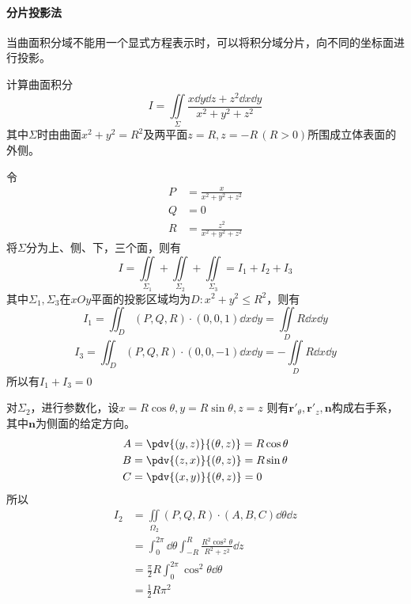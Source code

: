 \paragraph{分片投影法}
当曲面积分域不能用一个显式方程表示时，可以将积分域分片，向不同的坐标面进行投影。
\begin{example}
    计算曲面积分
    \[ I = \iint\limits_\Sigma \frac{x\dd{y}\dd{z} + z^2\dd{x}\dd{y}}{x^2+y^2+z^2} \]
    其中$\Sigma$时由曲面$x^2+y^2=R^2$及两平面$z=R,z=-R\,(R>0)$所围成立体表面的外侧。
\end{example}
\begin{solution}
    令
    \begin{align*}
        P & = \frac{x}{x^2 + y^2 + z^2}   \\
        Q & = 0                           \\
        R & = \frac{z^2}{x^2 + y^2 + z^2}
    \end{align*}
    将$\Sigma$分为上、侧、下，三个面，则有
    \[ I = \iint\limits_{\Sigma_1} + \iint\limits_{\Sigma_2} + \iint\limits_{\Sigma_3} = I_1 + I_2 + I_3 \]
    其中$\Sigma_1,\Sigma_3$在$xOy$平面的投影区域均为$D : x^2+y^2\leq R^2$，则有
    \[ I_1 = \iint_D (P,Q,R)\cdot(0,0,1)\dd{x}\dd{y} = \iint\limits_D R\dd{x}\dd{y} \]
    \[ I_3 = \iint_D (P,Q,R)\cdot(0,0,-1)\dd{x}\dd{y} = -\iint\limits_D R\dd{x}\dd{y} \]
    所以有$I_1+I_3=0$

    对$\Sigma_2$，进行参数化，设$x=R\cos\theta, y=R\sin\theta, z=z$
    则有$\bm{r}'_\theta,\bm{r}'_z,\bm{n}$构成右手系，其中$\bm{n}$为侧面的给定方向。
    \begin{align*}
        A & = \pdv{(y,z)}{(\theta,z)} = R\cos\theta \\
        B & = \pdv{(z,x)}{(\theta,z)} = R\sin\theta \\
        C & = \pdv{(x,y)}{(\theta,z)} = 0
    \end{align*}
    所以
    \begin{align*}
        I_2 & = \iint\limits_{\Omega_2} (P,Q,R)\cdot(A,B,C)\dd{\theta}\dd{z}                \\
            & =\int_0^{2\pi}\dd{\theta}\int_{-R}^R \frac{R^2\cos^2\theta}{R^2 + z^2} \dd{z} \\
            & = \frac{\pi}{2}R\int_0^{2\pi} \cos^2\theta \dd{\theta}                        \\
            & =\frac{1}{2}R\pi^2
    \end{align*}
\end{solution}

